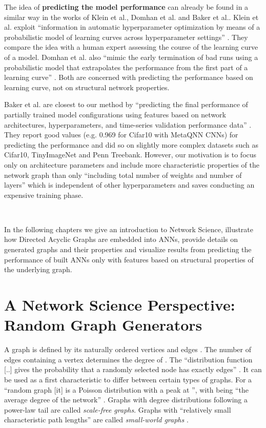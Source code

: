 \documentclass[runningheads]{llncs}
\begin{document}
The idea of \textbf{predicting the model performance} can already be found in a similar way in the works of Klein et al., Domhan et al. and Baker et al..
Klein et al. exploit ``information in automatic hyperparameter optimization by means of a probabilistic model of learning curves across hyperparameter settings'' \cite{klein2016learning}.
They compare the idea with a human expert assessing the course of the learning curve of a model.
Domhan et al. also ``mimic the early termination of bad runs using a probabilistic model that extrapolates the performance from the first part of a learning curve'' \cite{domhan2015speeding}.
Both are concerned with predicting the performance based on learning curve, not on structural network properties.

Baker et al. are closest to our method by ``predicting the final performance of partially trained model configurations using features based on network architectures, hyperparameters, and time-series validation performance data'' \cite{baker2018accelerating}.
They report good  values (e.g. 0.969 for Cifar10 with MetaQNN CNNs) for predicting the performance and did so on slightly more complex datasets such as Cifar10, TinyImageNet and Penn Treebank.
However, our motivation is to focus only on architecture parameters and include more characteristic properties of the network graph than only ``including total number of weights and number of layers'' which is independent of other hyperparameters and saves conducting an expensive training phase.

~

\noindent In the following chapters we give an introduction to Network Science, illustrate how Directed Acyclic Graphs are embedded into ANNs, provide details on generated graphs and their properties and visualize results from predicting the performance of built ANNs only with features based on structural properties of the underlying graph.


\section{A Network Science Perspective: Random Graph Generators}
A graph  is defined by its naturally ordered vertices  and edges .
The number of edges containing a vertex  determines the degree of .
The ``distribution function  [..] gives the probability that a randomly selected node has exactly  edges'' \cite{albert2002statistical}.
It can be used as a first characteristic to differ between certain types of graphs.
For a ``random graph [it] is a Poisson distribution with a peak at '', with  being ``the average degree of the network'' \cite{albert2002statistical}.
Graphs with degree distributions following a power-law tail  are called \textit{scale-free graphs}.
Graphs with ``relatively small characteristic path lengths'' are called \textit{small-world graphs} \cite{watts1998collective}.
\end{document}

